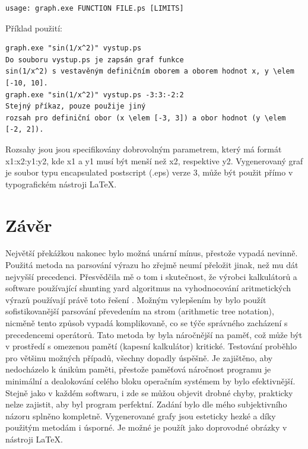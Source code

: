 \documentclass[11pt]{article}
\begin{document}
\begin{verbatim}
usage: graph.exe FUNCTION FILE.ps [LIMITS]
\end{verbatim}
Příklad použití:
\begin{verbatim}
graph.exe "sin(1/x^2)" vystup.ps 
Do souboru vystup.ps je zapsán graf funkce
sin(1/x^2) s vestavěným definičním oborem a oborem hodnot x, y \elem [-10, 10].
graph.exe "sin(1/x^2)" vystup.ps -3:3:-2:2 
Stejný příkaz, pouze použije jiný
rozsah pro definiční obor (x \elem [-3, 3]) a obor hodnot (y \elem [-2, 2]).
\end{verbatim}
Rozsahy jsou jsou specifikovány dobrovolným parametrem, který má formát x1:x2:y1:y2, kde x1 a y1 musí být menší než x2, respektive y2. 
Vygenerovaný graf je soubor typu encapsulated postscript (.eps) verze 3, může
být použit přímo v typografickém nástroji \LaTeX.

\section{Závěr}
Největší překážkou nakonec bylo možná unární mínus, přestože vypadá nevinně.
Použitá metoda na parsování výrazu ho zřejmě neumí přeložit jinak, než mu dát
nejvyšší precedenci. Přesvědčila mě o tom i skutečnost, že výrobci kalkulátorů
a software používající shunting yard algoritmus na vyhodnocování aritmetických
výrazů používají právě toto řešení \cite{minus}. Možným vylepšením by bylo
použít sofistikovanější parsování převedením na strom (arithmetic tree
notation), nicměně tento způsob vypadá komplikovaně, co se týče správného
zacházení s precedencemi operátorů. Tato metoda by byla náročnější na paměť,
což může být v prostředí s omezenou pamětí (kapesní kalkulátor) kritické.
Testování proběhlo pro většinu možných případů, všechny dopadly úspěšně. Je
zajištěno, aby nedocházelo k únikům paměti, přestože paměťová náročnost
programu je minimální a dealokování celého bloku operačním systémem by bylo
efektivnější.  Stejně jako v každém softwaru, i zde se můžou objevit drobné
chyby, prakticky nelze zajistit, aby byl program perfektní.
Zadání bylo dle mého subjektivního názoru splněno kompletně. Vygenerované grafy
jsou esteticky hezké a díky použitým metodám i úsporné. Je možné je použít jako
doprovodné obrázky v nástroji \LaTeX.
\end{document}
